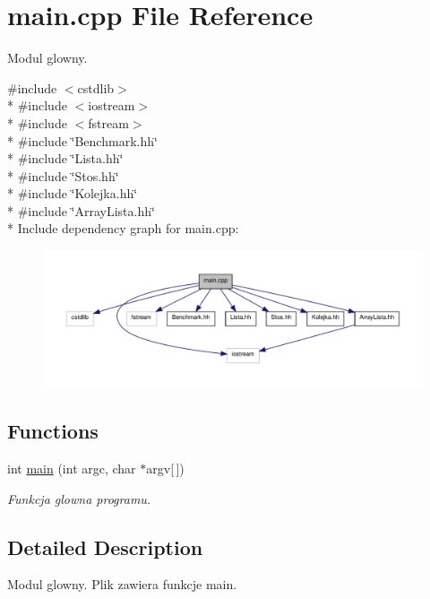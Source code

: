 \hypertarget{a00014}{\section{main.\-cpp File Reference}
\label{a00014}
}


Modul glowny.  


{\ttfamily \#include $<$cstdlib$>$}\\*
{\ttfamily \#include $<$iostream$>$}\\*
{\ttfamily \#include $<$fstream$>$}\\*
{\ttfamily \#include \char`\"{}Benchmark.\-hh\char`\"{}}\\*
{\ttfamily \#include \char`\"{}Lista.\-hh\char`\"{}}\\*
{\ttfamily \#include \char`\"{}Stos.\-hh\char`\"{}}\\*
{\ttfamily \#include \char`\"{}Kolejka.\-hh\char`\"{}}\\*
{\ttfamily \#include \char`\"{}Array\-Lista.\-hh\char`\"{}}\\*
Include dependency graph for main.\-cpp\-:\nopagebreak
\begin{figure}[H]
\begin{center}
\leavevmode
\includegraphics[width=350pt]{a00028}
\end{center}
\end{figure}
\subsection*{Functions}
\begin{DoxyCompactItemize}
\item 
int \hyperlink{a00014_a0ddf1224851353fc92bfbff6f499fa97}{main} (int argc, char $\ast$argv\mbox{[}$\,$\mbox{]})
\begin{DoxyCompactList}\small\item\em Funkcja glowna programu. \end{DoxyCompactList}\end{DoxyCompactItemize}


\subsection{Detailed Description}
Modul glowny. Plik zawiera funkcje main. 

